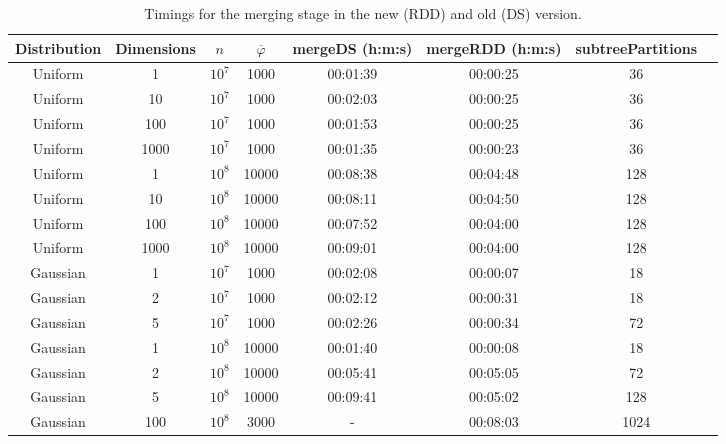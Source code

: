 \documentclass{report}
\begin{document}
\begin{table}
\begin{center}
\begin{tabular}{|c  c  c | c | c | c | c | c |}
	\hline
	Distribution &  Dimensions &  $n$ & $\overline{\varphi}$ & mergeDS (h:m:s) & mergeRDD (h:m:s) & subtreePartitions \\
	\hline
	Uniform	& 1  & 		$10^7$ & 1000  & 00:01:39 & 00:00:25 &  36 \\
	Uniform	& 10  & 	$10^7$ & 1000  & 00:02:03 & 00:00:25 &  36 \\
	Uniform	& 100  & 	$10^7$ & 1000  & 00:01:53 & 00:00:25 &  36 \\
	Uniform	& 1000  & 	$10^7$ & 1000  & 00:01:35 & 00:00:23 &  36 \\
	\hline
	Uniform & 1  & 		$10^8$ & 10000 & 00:08:38 & 00:04:48 &  128 \\
	Uniform & 10  & 	$10^8$ & 10000 & 00:08:11 & 00:04:50 &  128 \\
	Uniform & 100  & 	$10^8$ & 10000 & 00:07:52 & 00:04:00 &  128 \\
	Uniform & 1000  & 	$10^8$ & 10000 & 00:09:01 & 00:04:00 &  128 \\
	\hline
	\hline
	Gaussian  & 1  & 	$10^7$ & 1000  & 00:02:08 & 00:00:07 & 18 \\
	Gaussian  & 2  & 	$10^7$ & 1000  & 00:02:12 & 00:00:31 & 18	\\
	Gaussian  & 5  & 	$10^7$ & 1000  & 00:02:26 & 00:00:34 & 72\\
	\hline
	Gaussian  & 1  & 	$10^8$ & 10000 & 00:01:40 & 00:00:08 & 18\\
	Gaussian  & 2  & 	$10^8$ & 10000 & 00:05:41 & 00:05:05 & 72\\
	Gaussian  & 5  & 	$10^8$ & 10000 & 00:09:41 & 00:05:02 & 128\\
	Gaussian  & 100  & 	$10^8$ & 3000  & - 	  & 00:08:03 & 1024\\
	\hline
\end{tabular}
\end{center}
\caption{Timings for the merging stage in the new (RDD) and old (DS) version.}
\label{rdd_ds_table}
\end{table}
\end{document}
